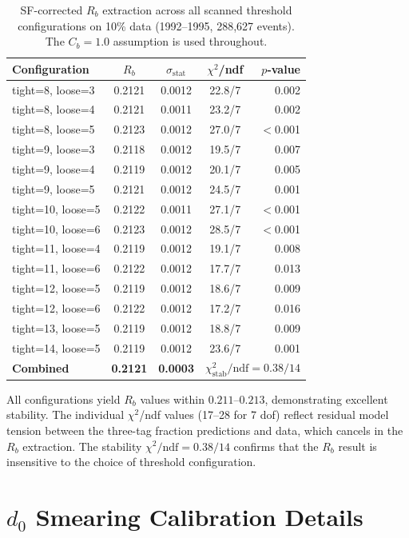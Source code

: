 \documentclass[11pt,a4paper]{article}
\begin{document}
\begin{table}[htbp]
\centering
\caption{SF-corrected $R_b$ extraction across all scanned
threshold configurations on 10\% data (1992--1995, 288,627
events). The $C_b = 1.0$ assumption is used throughout.}
\label{tbl:rb_all_wp}
\begin{tabular}{lcccr}
\toprule
Configuration & $R_b$ & $\sigma_\text{stat}$ &
$\chi^2$/ndf & $p$-value \\
\midrule
tight=8, loose=3  & 0.2121 & 0.0012 & 22.8/7 & 0.002 \\
tight=8, loose=4  & 0.2121 & 0.0011 & 23.2/7 & 0.002 \\
tight=8, loose=5  & 0.2123 & 0.0012 & 27.0/7 & $<$0.001 \\
tight=9, loose=3  & 0.2118 & 0.0012 & 19.5/7 & 0.007 \\
tight=9, loose=4  & 0.2119 & 0.0012 & 20.1/7 & 0.005 \\
tight=9, loose=5  & 0.2121 & 0.0012 & 24.5/7 & 0.001 \\
tight=10, loose=5 & 0.2122 & 0.0011 & 27.1/7 & $<$0.001 \\
tight=10, loose=6 & 0.2123 & 0.0012 & 28.5/7 & $<$0.001 \\
tight=11, loose=4 & 0.2119 & 0.0012 & 19.1/7 & 0.008 \\
tight=11, loose=6 & 0.2122 & 0.0012 & 17.7/7 & 0.013 \\
tight=12, loose=5 & 0.2119 & 0.0012 & 18.6/7 & 0.009 \\
tight=12, loose=6 & 0.2122 & 0.0012 & 17.2/7 & 0.016 \\
tight=13, loose=5 & 0.2119 & 0.0012 & 18.8/7 & 0.009 \\
tight=14, loose=5 & 0.2119 & 0.0012 & 23.6/7 & 0.001 \\
\midrule
\textbf{Combined} & \textbf{0.2121} & \textbf{0.0003} &
\multicolumn{2}{c}{$\chi^2_\text{stab}/\text{ndf} = 0.38/14$} \\
\bottomrule
\end{tabular}
\end{table}

All configurations yield $R_b$ values within $0.211$--$0.213$,
demonstrating excellent stability.
The individual $\chi^2$/ndf values (17--28 for 7 dof) reflect
residual model tension between the three-tag fraction predictions
and data, which cancels in the $R_b$ extraction.
The stability $\chi^2/\text{ndf} = 0.38/14$ confirms that the
$R_b$ result is insensitive to the choice of threshold
configuration.

\section{$d_0$ Smearing Calibration Details}
\label{app:d0_smearing}
\end{document}
